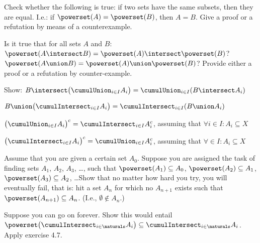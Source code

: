\documentclass{report}
\begin{document}
\begin{Exercise} [number=31]
Check whether the following is true: if two sets have the same subsets, then they are equal. I.e.: if $\powerset(A) = \powerset(B)$, then $A = B$. Give a proof or a refutation by means of a counterexample.
\end{Exercise}

\begin{Exercise} [number=32]
Is it true that for all sets $A$ and $B$:
\Question $\powerset(A \intersect B) = \powerset(A) \intersect \powerset(B)$?
\Question $\powerset(A \union B) = \powerset(A) \union \powerset(B)$?
\ExeText Provide either a proof or a refutation by counter-example.
\end{Exercise}

\begin{Exercise} [number=33, difficulty=1]
  Show:
  \Question $B \intersect \bigl( \cumulUnion_{i \in I} A_i \bigr) =
  \cumulUnion_{i \in I}(B \intersect A_i)$
  
  \Question $B \union \bigl( \cumulIntersect_{i \in I} A_i \bigr) = \cumulIntersect_{i
    \in I}(B \union A_i)$
  
  \Question $\bigl(\cumulUnion_{i \in I} A_i \bigr)^c =
  \cumulIntersect_{i \in I} A_{i}^{c}$, assuming that $\forall{i} \in
  I \colon A_i \subseteq X$

  \Question $\bigl(\cumulIntersect_{i \in I} A_i \bigr)^c =
  \cumulUnion_{i \in I} A_{i}^{c}$, assuming that $\forall \in I
  \colon A_i \subseteq X$
\end{Exercise}

\begin{Exercise} [number=34, difficulty=1]
  Assume that you are given a certain set $A_0$. Suppose you are
  assigned the task of finding sets $A_1$, $A_2$, $A_3$, \dots, such
  that $\powerset(A_1) \subseteq A_0$, $\powerset(A_2) \subseteq A_1$,
  $\powerset(A_3) \subseteq A_2$, \dots Show that no matter how hard
  you try, you will eventually fail, that is: hit a set $A_n$ for
  which no $A_{n+1}$ exists such that $\powerset(A_{n+1}) \subseteq
  A_n$. (I.e., $\emptyset \notin A_n$.)

  \ExeText Suppose you can go on forever. Show this would entail
  $\powerset\bigl(\cumulIntersect_{i \in \naturals} A_i \bigr)
  \subseteq \cumulIntersect_{i \in \naturals} A_i$. Apply exercise 4.7.
\end{Exercise}
\end{document}

